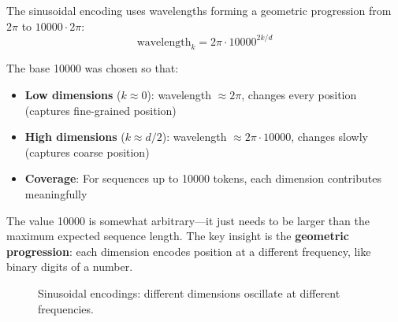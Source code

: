 \begin{remark}
    The sinusoidal encoding uses wavelengths forming a geometric progression from $2\pi$ to $10000 \cdot 2\pi$:
    \[
        \text{wavelength}_k = 2\pi \cdot 10000^{2k/d}
    \]

    The base 10000 was chosen so that:
    \begin{itemize}
        \item \textbf{Low dimensions} ($k \approx 0$): wavelength $\approx 2\pi$, changes every position (captures fine-grained position)
        \item \textbf{High dimensions} ($k \approx d/2$): wavelength $\approx 2\pi \cdot 10000$, changes slowly (captures coarse position)
        \item \textbf{Coverage}: For sequences up to 10000 tokens, each dimension contributes meaningfully
    \end{itemize}

    The value 10000 is somewhat arbitrary---it just needs to be larger than the maximum expected sequence length. The key insight is the \textbf{geometric progression}: each dimension encodes position at a different frequency, like binary digits of a number.

    \begin{figure}[h]
    \centering
    \caption{Sinusoidal encodings: different dimensions oscillate at different frequencies.}
    \end{figure}
\end{remark}


